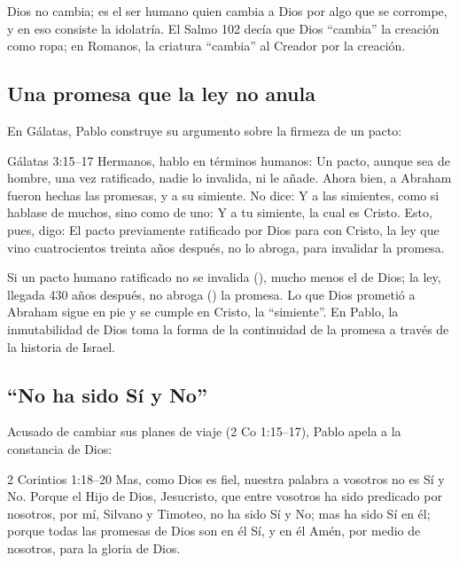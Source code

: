 Dios no cambia; es el ser humano quien cambia a Dios por algo que se corrompe, y en eso consiste la idolatría. El Salmo 102 decía que Dios ``cambia'' la creación como ropa; en Romanos, la criatura ``cambia'' al Creador por la creación.


\subsection{Una promesa que la ley no anula}
En Gálatas, Pablo construye su argumento sobre la firmeza de un pacto:

\begin{verso}{Gálatas 3:15–17}
Hermanos, hablo en términos humanos: Un pacto, aunque sea de hombre, una vez ratificado, nadie lo invalida, ni le añade. Ahora bien, a Abraham fueron hechas las promesas, y a su simiente. No dice: Y a las simientes, como si hablase de muchos, sino como de uno: Y a tu simiente, la cual es Cristo. Esto, pues, digo: El pacto previamente ratificado por Dios para con Cristo, la ley que vino cuatrocientos treinta años después, no lo abroga, para invalidar la promesa.
\end{verso}

Si un pacto humano ratificado no se invalida (), mucho menos el de Dios; la ley, llegada 430 años después, no abroga () la promesa. Lo que Dios prometió a Abraham sigue en pie y se cumple en Cristo, la ``simiente''. En Pablo, la inmutabilidad de Dios toma la forma de la continuidad de la promesa a través de la historia de Israel.

\subsection{“No ha sido Sí y No”}
Acusado de cambiar sus planes de viaje (2 Co 1:15--17), Pablo apela a la constancia de Dios:

\begin{verso}{2 Corintios 1:18–20}
Mas, como Dios es fiel, nuestra palabra a vosotros no es Sí y No. Porque el Hijo de Dios, Jesucristo, que entre vosotros ha sido predicado por nosotros, por mí, Silvano y Timoteo, no ha sido Sí y No; mas ha sido Sí en él; porque todas las promesas de Dios son en él Sí, y en él Amén, por medio de nosotros, para la gloria de Dios.
\end{verso}

